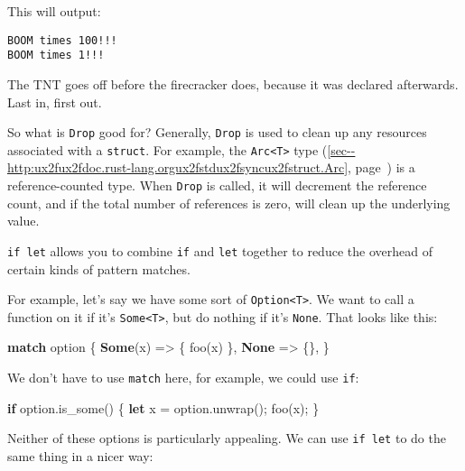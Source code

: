 \documentclass[a4paper,]{book}
\renewcommand*{\hyperref}[2][\ar]{%
  \def\ar{#2}%
  #2 (\autoref{#1}, page~\pageref{#1})}
\newenvironment{Shaded}{\begin{snugshade}}{\end{snugshade}}
\newcommand{\KeywordTok}[1]{\textcolor[rgb]{0.13,0.29,0.53}{\textbf{{#1}}}}
\newcommand{\NormalTok}[1]{{#1}}
\begin{document}
This will output:

\begin{verbatim}
BOOM times 100!!!
BOOM times 1!!!
\end{verbatim}

The TNT goes off before the firecracker does, because it was declared
afterwards. Last in, first out.

So what is \texttt{Drop} good for? Generally, \texttt{Drop} is used to
clean up any resources associated with a \texttt{struct}. For example,
the
\hyperref[sec--http:ux2fux2fdoc.rust-lang.orgux2fstdux2fsyncux2fstruct.Arc]{\texttt{Arc\textless{}T\textgreater{}}
type} is a reference-counted type. When \texttt{Drop} is called, it will
decrement the reference count, and if the total number of references is
zero, will clean up the underlying value.


\texttt{if\ let} allows you to combine \texttt{if} and \texttt{let}
together to reduce the overhead of certain kinds of pattern matches.

For example, let's say we have some sort of
\texttt{Option\textless{}T\textgreater{}}. We want to call a function on
it if it's \texttt{Some\textless{}T\textgreater{}}, but do nothing if
it's \texttt{None}. That looks like this:

\begin{Shaded}
\begin{Highlighting}[]
\KeywordTok{match} \NormalTok{option \{}
    \KeywordTok{Some}\NormalTok{(x) => \{ foo(x) \},}
    \KeywordTok{None} \NormalTok{=> \{\},}
\NormalTok{\}}
\end{Highlighting}
\end{Shaded}

We don't have to use \texttt{match} here, for example, we could use
\texttt{if}:

\begin{Shaded}
\begin{Highlighting}[]
\KeywordTok{if} \NormalTok{option.is_some() \{}
    \KeywordTok{let} \NormalTok{x = option.unwrap();}
    \NormalTok{foo(x);}
\NormalTok{\}}
\end{Highlighting}
\end{Shaded}

Neither of these options is particularly appealing. We can use
\texttt{if\ let} to do the same thing in a nicer way:
\end{document}
